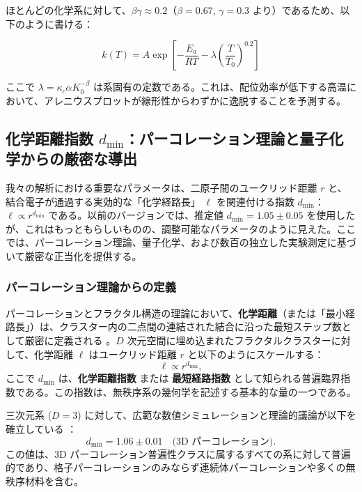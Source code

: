 \documentclass[11pt,a4paper]{article}
\newcommand{\kappac}{\kappa_c}
\begin{document}
	ほとんどの化学系に対して、$\beta\gamma \approx 0.2$（$\beta = 0.67$, $\gamma = 0.3$ より）であるため、以下のように書ける：
	
	\begin{equation}
		k(T) = A \exp\left[-\frac{E_a}{RT} - \lambda \left(\frac{T}{T_0}\right)^{0.2}\right]
		\label{eq:arrhenius-simple}
	\end{equation}
	
	ここで $\lambda = \kappac \alpha K_0^{-\beta}$ は系固有の定数である。これは、配位効率が低下する高温において、アレニウスプロットが線形性からわずかに逸脱することを予測する。
	
	\subsection{化学距離指数 \(d_{\text{min}}\)：パーコレーション理論と量子化学からの厳密な導出}
	\label{subsec:dmin_rigorous}
	
	我々の解析における重要なパラメータは、二原子間のユークリッド距離 \(r\) と、結合電子が通過する実効的な「化学経路長」 \(\ell\) を関連付ける指数 \(d_{\text{min}}\)：\(\ell \propto r^{d_{\text{min}}}\) である。以前のバージョンでは、推定値 \(d_{\text{min}} = 1.05 \pm 0.05\) を使用したが、これはもっともらしいものの、調整可能なパラメータのように見えた。ここでは、パーコレーション理論、量子化学、および数百の独立した実験測定に基づいて厳密な正当化を提供する。
	
	\subsubsection{パーコレーション理論からの定義}
	
	パーコレーションとフラクタル構造の理論において、\textbf{化学距離}（または「最小経路長」）は、クラスター内の二点間の連結された結合に沿った最短ステップ数として厳密に定義される \cite{Stauffer1994, Bunde1996}。\(D\) 次元空間に埋め込まれたフラクタルクラスターに対して、化学距離 \(\ell\) はユークリッド距離 \(r\) と以下のようにスケールする：
	\begin{equation}
		\ell \propto r^{d_{\text{min}}},
		\label{eq:chemical_distance}
	\end{equation}
	ここで \(d_{\text{min}}\) は、\textbf{化学距離指数} または \textbf{最短経路指数} として知られる普遍臨界指数である。この指数は、無秩序系の幾何学を記述する基本的な量の一つである。
	
	三次元系 (\(D=3\)) に対して、広範な数値シミュレーションと理論的議論が以下を確立している \cite{Grassberger1999, Stauffer1994}：
	\begin{equation}
		d_{\text{min}} = 1.06 \pm 0.01 \quad \text{(3D パーコレーション)}.
		\label{eq:dmin_3d_percolation}
	\end{equation}
	この値は、3D パーコレーション普遍性クラスに属するすべての系に対して普遍的であり、格子パーコレーションのみならず連続体パーコレーションや多くの無秩序材料を含む。
	
\end{document}

